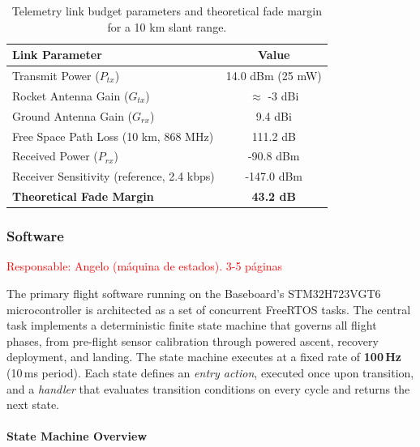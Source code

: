 \documentclass[11pt, a4paper]{article} %
\begin{document}
\vspace{1em}
\begin{table}[H]
    \centering
    \renewcommand{\arraystretch}{1.2}
    \begin{tabularx}{0.8\textwidth}{|X|c|}
        \hline
        \textbf{Link Parameter} & \textbf{Value} \\ \hline
        Transmit Power ($P_{tx}$) & 14.0 dBm (25 mW) \\ \hline
        Rocket Antenna Gain ($G_{tx}$) & $\approx$  -3 dBi \\ \hline
        Ground Antenna Gain ($G_{rx}$) & 9.4 dBi \\ \hline
        Free Space Path Loss (10 km, 868 MHz) & 111.2 dB \\ \hline
        \rowcolor{gray!10}
        Received Power ($P_{rx}$) & -90.8 dBm \\ \hline
        Receiver Sensitivity (reference, 2.4 kbps) & -147.0 dBm \\ \hline
        \textbf{Theoretical Fade Margin} & \textbf{43.2 dB} \\ \hline
    \end{tabularx}
    \caption{Telemetry link budget parameters and theoretical fade margin for a 10 km slant range.}
    \label{tab:link_budget}
\end{table}

\subsubsection{Software} \label{subsubsec:software} \textcolor{red}{Responsable: Angelo (máquina de estados). 3-5 páginas} 

\newcommand{\cfg}[1]{\texttt{\seqsplit{#1}}}

The primary flight software running on the Baseboard's STM32H723VGT6 microcontroller is architected as a set of concurrent FreeRTOS tasks. The central task implements a deterministic finite state machine that governs all flight phases, from pre-flight sensor calibration through powered ascent, recovery deployment, and landing. The state machine executes at a fixed rate of \textbf{100\,Hz} (10\,ms period). Each state defines an \emph{entry action}, executed once upon transition, and a \emph{handler} that evaluates transition conditions on every cycle and returns the next state.

\paragraph{State Machine Overview}
\end{document}
